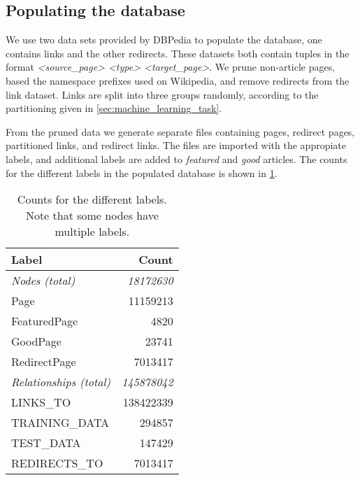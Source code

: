 \subsection{Populating the database} \label{sec:db_populate}
We use two data sets provided by DBPedia to populate the database, one contains links and the other redirects. These datasets both contain tuples in the format \emph{<source\_page> <type> <target\_page>}.  We prune non-article pages, based the namespace prefixes used on Wikipedia, and remove redirects from the link dataset. Links are split into three groups randomly, according to the partitioning given in \cref{sec:machine_learning_task}. 

From the pruned data we generate separate files containing pages, redirect pages, partitioned links, and redirect links. The files are imported with the appropiate labels, and additional labels are added to \emph{featured} and \emph{good} articles.
 The counts for the different labels in the populated database is shown in \cref{tab:db_counts}.

\begin{table}[tbp]
\centering
\begin{tabular}{@{}lr@{}}
\toprule
\textbf{Label}         & \textbf{Count}     \\ \midrule
\textit{Nodes (total)} & \textit{18172630}  \\
Page                   & 11159213           \\
FeaturedPage           & 4820               \\
GoodPage               & 23741              \\
RedirectPage           & 7013417            \\ \midrule
\textit{Relationships (total)} & \textit{145878042} \\
LINKS\_TO              & 138422339          \\
TRAINING\_DATA         & 294857             \\
TEST\_DATA             & 147429             \\
REDIRECTS\_TO          & 7013417            \\ \bottomrule
\end{tabular}
\caption{Counts for the different labels. Note that some nodes have multiple labels.}
\label{tab:db_counts}
\end{table}
